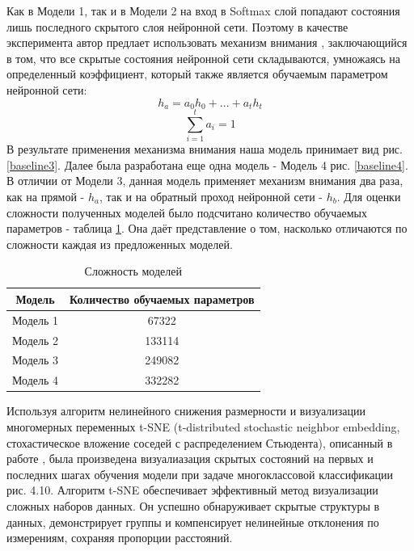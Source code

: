     Как в Модели 1, так и в Модели 2 на вход в Softmax слой попадают состояния лишь последного скрытого слоя нейронной сети. Поэтому в качестве эксперимента автор предлает использовать механизм внимания \cite{Bahdanau}, заключающийся в том, что все скрытые состояния нейронной сети складываются, умножаясь на определенный коэффициент, который также является обучаемым параметром нейронной сети:
    \begin{equation}\label{attention}
    {h_{a}} = a_{0}h_{0}+...+a_{t}h_{t}
    \end{equation}
    \begin{equation}\label{coeff}
    \sum_{i=1}^{t} a_{i}=1
    \end{equation}
    В результате применения механизма внимания наша модель принимает вид рис. \ref{baseline3}.
    Далее была разработана еще одна модель - Модель 4 рис. \ref{baseline4}. В отличии от Модели 3, данная модель применяет механизм внимания два раза, как на прямой - $h_{a}$, так и на обратный проход нейронной сети - $h_{b}$.
    Для оценки сложности полученных моделей было подсчитано количество обучаемых параметров - таблица \ref{hard}. Она даёт представление о том, насколько отличаются по сложности каждая из предложенных моделей.
    \begin{table}[H]
    \centering
    \caption{Сложность моделей}\label{hard}
    \begin{tabular}{@{}cc@{}}
    \toprule
    Модель         & Количество обучаемых параметров \\ \midrule
    Модель 1 & 67322     \\
    Модель 2 & 133114      \\
    Модель 3 & 249082    \\
    Модель 4 & 332282   \\ \bottomrule
    \end{tabular}
    \end{table}

    Используя алгоритм нелинейного снижения размерности и визуализации многомерных переменных t-SNE (t-distributed stochastic neighbor embedding, стохастическое вложение соседей с распределением Стьюдента), описанный в работе \cite{Maaten}, была произведена визуалиазация скрытых состояний на первых и последних шагах обучения модели при задаче многоклассовой классификации рис. 4.10. Алгоритм t-SNE обеспечивает эффективный метод визуализации сложных наборов данных. Он успешно обнаруживает скрытые структуры в данных, демонстрирует группы и компенсирует нелинейные отклонения по измерениям, сохраняя пропорции расстояний.

